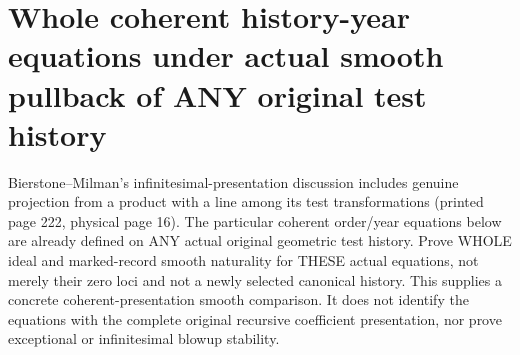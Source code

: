 \section{Whole coherent history-year equations under actual smooth pullback of ANY original test history}

Bierstone--Milman's infinitesimal-presentation discussion includes genuine
projection from a product with a line among its test transformations
(printed page 222, physical page 16). The particular coherent order/year
equations below are already defined on ANY actual original geometric test
history. Prove WHOLE ideal and marked-record smooth naturality for THESE
actual equations, not merely their zero loci and not a newly selected
canonical history. This supplies a concrete coherent-presentation smooth
comparison. It does not identify the equations with the complete original
recursive coefficient presentation, nor prove exceptional or infinitesimal
blowup stability.

